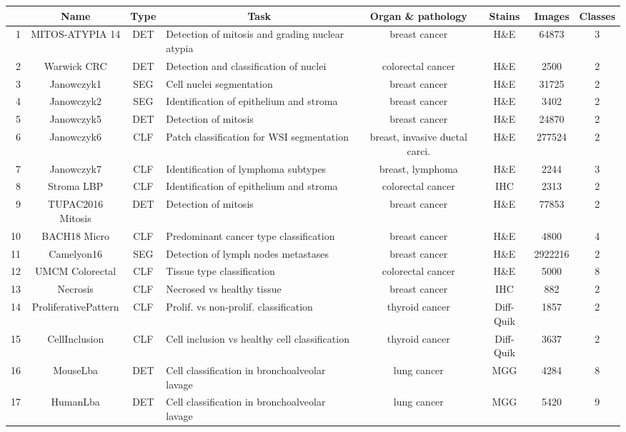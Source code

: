 \begin{table}[t]
    \centering
    \tiny
    \begin{tabular}{|r|c|c|l|c|c|c|c|}
        \hline
        & \textbf{Name} & Type & \multicolumn{1}{c|}{Task} & Organ \& pathology & Stains & Images & Classes \\
        \hline
1 & MITOS-ATYPIA 14 & DET & Detection of mitosis and grading nuclear atypia & breast cancer & H\&E & 64873 & 3 \\
2 & Warwick CRC & DET & Detection and classification of nuclei & colorectal cancer & H\&E & 2500 & 2 \\
3 & Janowczyk1 & SEG & Cell nuclei segmentation & breast cancer & H\&E & 31725 & 2 \\
4 & Janowczyk2 & SEG & Identification of epithelium and stroma & breast cancer & H\&E & 3402 & 2 \\
5 & Janowczyk5 & DET & Detection of mitosis & breast cancer & H\&E & 24870 & 2 \\
6 & Janowczyk6 & CLF & Patch classification for WSI segmentation & breast, invasive ductal carci. & H\&E & 277524 & 2 \\
7 & Janowczyk7 & CLF & Identification of lymphoma subtypes & breast, lymphoma & H\&E & 2244 & 3 \\
8 & Stroma LBP & CLF & Identification of epithelium and stroma & colorectal cancer & IHC & 2313 & 2 \\
9 & TUPAC2016 Mitosis & DET & Detection of mitosis & breast cancer & H\&E & 77853 & 2 \\
10 & BACH18 Micro & CLF & Predominant cancer type classification & breast cancer & H\&E & 4800 & 4 \\ 
11 & Camelyon16 & SEG & Detection of lymph nodes metastases & breast cancer & H\&E & 2922216 & 2 \\
12 & UMCM Colorectal & CLF & Tissue type classification & colorectal cancer & H\&E& 5000 & 8 \\
13 & Necrosis & CLF & Necrosed vs healthy tissue & breast cancer & IHC & 882 & 2 \\
14 & ProliferativePattern & CLF & Prolif. vs non-prolif. classification & thyroid cancer & Diff-Quik & 1857 & 2 \\
15 & CellInclusion & CLF & Cell inclusion vs healthy cell classification & thyroid cancer & Diff-Quik & 3637 & 2 \\
16 & MouseLba & DET & Cell classification in bronchoalveolar lavage & lung cancer & MGG & 4284 & 8 \\
17 & HumanLba & DET & Cell classification in bronchoalveolar lavage & lung cancer & MGG & 5420 & 9 \\

\end{tabular}
\end{table}
